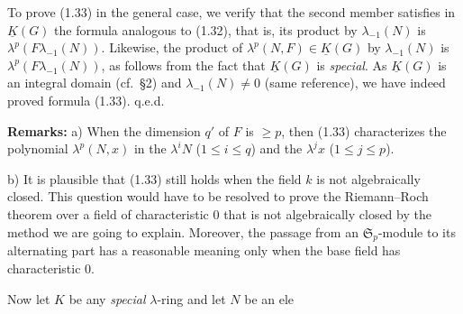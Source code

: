 To prove (1.33) in the general case, we verify that the second member satisfies in $\underline{K}(G)$ the formula analogous to (1.32), that is, its product by $\lambda_{-1}(N)$ is $\lambda^p(F\lambda_{-1}(N))$. Likewise, the product of $\lambda^p(N,F)\in \underline{K}(G)$ by $\lambda_{-1}(N)$ is $\lambda^p(F\lambda_{-1}(N))$, as follows from the fact that $\underline{K}(G)$ is \emph{special}. As $\underline{K}(G)$ is an integral domain (cf.\ \S 2) and $\lambda_{-1}(N)\neq0$ (same reference), we have indeed proved formula (1.33). q.e.d.

\textbf{Remarks:} a) When the dimension $q'$ of $F$ is $\geq p$, then (1.33) characterizes the polynomial $\lambda^p(N,x)$ in the $\lambda^iN$ ($1\leq i\leq q$) and the $\lambda^jx$ ($1\leq j\leq p$).

b) It is plausible that (1.33) still holds when the field $k$ is not algebraically closed. This question would have to be resolved to prove the Riemann--Roch theorem over a field of characteristic $0$ that is not algebraically closed by the method we are going to explain. Moreover, the passage from an $\mathfrak S_p$-module to its alternating part has a reasonable meaning only when the base field has characteristic $0$.

Now let $K$ be any \emph{special} $\lambda$-ring and let $N$ be an
ele%
